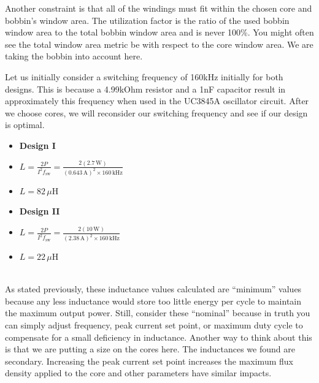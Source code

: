 \documentclass{article}
\begin{document}
Another constraint is that all of the windings must fit within the chosen core and 
bobbin’s window area.  The utilization factor is the ratio of the used bobbin window
area to the total bobbin window area and is never 100\%.  You might often see the total
window area metric be with respect to the core window area.  We are taking the bobbin
into account here.

Let us initially consider a switching frequency of 160kHz initially for both designs.
This is because a 4.99kOhm resistor and a 1nF capacitor result in approximately this
frequency when used in the UC3845A oscillator circuit.  After we choose cores, we will
reconsider our switching frequency and see if our design is optimal. \\

\noindent %
\begin{minipage}[t]{0.45\linewidth} %
    \begin{itemize}
        \renewcommand\labelitemi{} %
        \item \textbf{Design I}
        \item $L = \frac{2P}{I^2 f_{\text{sw}}} = \frac{2(2.7\, \text{W})}{(0.643\, \text{A})^2 \times 160\, \text{kHz}}$ \\
        \item $L = 82\, \mu\text{H}$
    \end{itemize}
\end{minipage}%
\hfill %
\begin{minipage}[t]{0.45\linewidth}
    \begin{itemize}
        \renewcommand\labelitemi{} %
        \item \textbf{Design II}
        \item $L = \frac{2P}{I^2 f_{\text{sw}}} = \frac{2(10\, \text{W})}{(2.38\, \text{A})^2 \times 160\, \text{kHz}}$ \\
        \item $L = 22\, \mu\text{H}$
    \end{itemize}
\end{minipage} \\

As stated previously, these inductance values calculated are “minimum” values because any
less inductance would store too little energy per cycle to maintain the maximum output
power.  Still, consider these “nominal” because in truth you can simply adjust
frequency, peak current set point, or maximum duty cycle to compensate for a small
deficiency in inductance.  Another way to think about this is that we are putting a
size on the cores here.  The inductances we found are secondary.  Increasing the peak
current set point increases the maximum flux density applied to the core and other
parameters have similar impacts.
\end{document}
